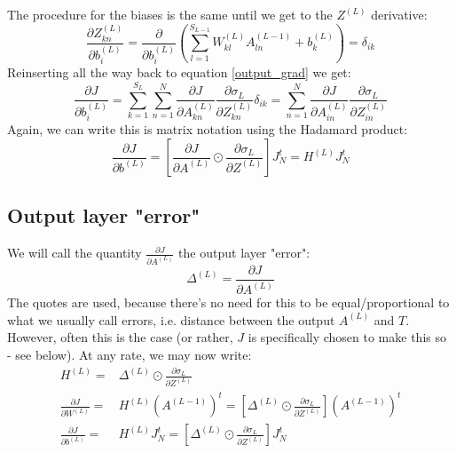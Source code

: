 \documentclass[12pt, a4paper]{article}
\numberwithin{equation}{section}
\begin{document}
The procedure for the biases is the same until we get to the $Z^{(L)}$ derivative:
\begin{equation}
\frac{\partial Z^{(L)}_{kn}}{\partial b^{(L)}_i}=\frac{\partial}{\partial b^{(L)}_i}\left(\sum_{l=1}^{S_{L-1}}W^{(L)}_{kl}A^{(L-1)}_{ln}+b^{(L)}_k\right)=\delta_{ik}
\end{equation}
Reinserting all the way back to equation \ref{output_grad} we get:
\begin{equation}
\frac{\partial J}{\partial b^{(L)}_i}=\sum_{k=1}^{S_L}\sum_{n=1}^N\frac{\partial J}{\partial A^{(L)}_{kn}}\frac{\partial\sigma_L}{\partial Z^{(L)}_{kn}}\delta_{ik}=\sum_{n=1}^N\frac{\partial J}{\partial A^{(L)}_{in}}\frac{\partial\sigma_L}{\partial Z^{(L)}_{in}}
\end{equation}
Again, we can write this is matrix notation using the Hadamard product:
\begin{equation}
\label{output_bias_matrix}
\frac{\partial J}{\partial b^{(L)}}=\left[\frac{\partial J}{\partial A^{(L)}}\odot\frac{\partial\sigma_L}{\partial Z^{(L)}}\right]J_N^t=H^{(L)}J_N^t
\end{equation}

\subsection{Output layer "error"}
We will call the quantity $\frac{\partial J}{\partial A^{(L)}}$ the output layer "error":
\begin{equation}
\Delta^{(L)}=\frac{\partial J}{\partial A^{(L)}}
\end{equation}
The quotes are used, because there's no need for this to be equal/proportional to what we usually call errors, i.e. distance between the output $A^{(L)}$ and $T$. However, often this is the case (or rather, $J$ is specifically chosen to make this so - see below). At any rate, we may now write:
\begin{align}
\label{output_weights_H}
H^{(L)}=&\Delta^{(L)}\odot\frac{\partial\sigma_L}{\partial Z^{(L)}}\\
\frac{\partial J}{\partial W^{(L)}}=&H^{(L)}\left(A^{(L-1)}\right)^t=\left[\Delta^{(L)}\odot\frac{\partial\sigma_L}{\partial Z^{(L)}}\right]\left(A^{(L-1)}\right)^t\\
\label{output_bias_H}
\frac{\partial J}{\partial b^{(L)}}=&H^{(L)}J_N^t=\left[\Delta^{(L)}\odot\frac{\partial\sigma_L}{\partial Z^{(L)}}\right]J_N^t
\end{align}
\end{document}
